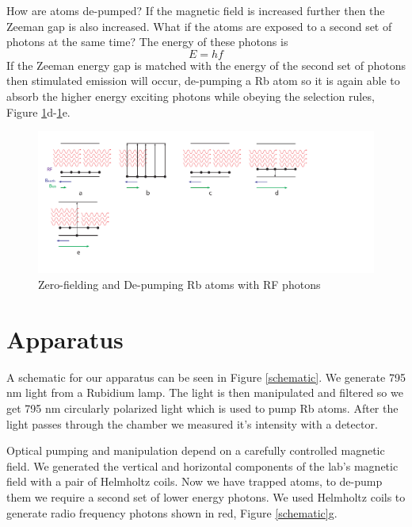 How are atoms de-pumped? If the magnetic field is increased further then the Zeeman gap is also increased. What if the atoms are exposed to a second set of photons at the same time? The energy of these photons is
\begin{equation}
E = hf
\end{equation}
If the Zeeman energy gap is matched with the energy of the second set of photons then stimulated emission will occur, de-pumping a Rb atom so it is again able to absorb the higher energy exciting photons while obeying the selection rules, Figure \ref{rfing}d-\ref{rfing}e.
\begin{figure}[H]
  \includegraphics{figs/rfing}
  \caption{Zero-fielding and De-pumping Rb atoms with RF photons}
  \label{rfing}
\end{figure}

\section{Apparatus}
A schematic for our apparatus can be seen in Figure \ref{schematic}. We generate 795 nm light from a Rubidium lamp. The light is then manipulated and filtered so we get 795 nm circularly polarized light which is used to pump Rb atoms. After the light passes through the chamber we measured it's intensity with a detector.

Optical pumping and manipulation depend on a carefully controlled magnetic field. We generated the vertical and horizontal components of the lab's magnetic field with a pair of Helmholtz coils. Now we have trapped atoms, to de-pump them we require a second set of lower energy photons. We used Helmholtz coils to generate radio frequency photons shown in red, Figure \ref{schematic}g.

